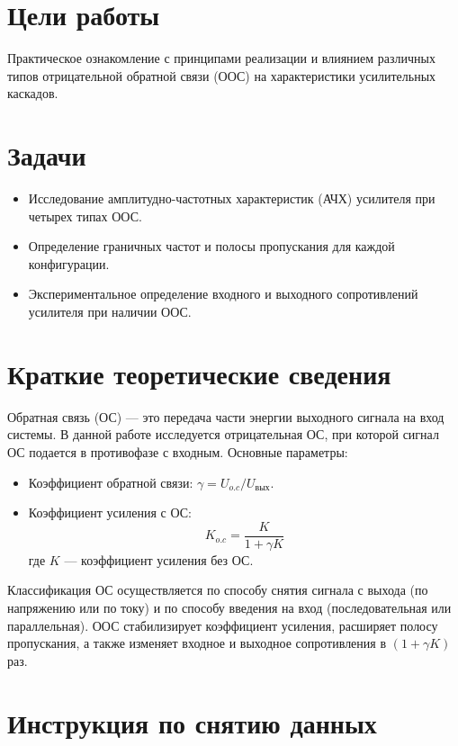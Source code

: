 \section*{Цели работы}
Практическое ознакомление с принципами реализации и влиянием различных типов отрицательной обратной связи (ООС) на характеристики усилительных каскадов.

\section*{Задачи}
\begin{itemize}
    \item Исследование амплитудно-частотных характеристик (АЧХ) усилителя при четырех типах ООС.
    \item Определение граничных частот и полосы пропускания для каждой конфигурации.
    \item Экспериментальное определение входного и выходного сопротивлений усилителя при наличии ООС.
\end{itemize}

\section*{Краткие теоретические сведения}
Обратная связь (ОС) — это передача части энергии выходного сигнала на вход системы. В данной работе исследуется отрицательная ОС, при которой сигнал ОС подается в противофазе с входным. Основные параметры:
\begin{itemize}
    \item Коэффициент обратной связи: $\gamma = U_{o.c} / U_{вых}$.
    \item Коэффициент усиления с ОС:
    \begin{equation*}
        K_{o.c} = \frac{K}{1 + \gamma K}
    \end{equation*}
    где $K$ — коэффициент усиления без ОС.
\end{itemize}
Классификация ОС осуществляется по способу снятия сигнала с выхода (по напряжению или по току) и по способу введения на вход (последовательная или параллельная). ООС стабилизирует коэффициент усиления, расширяет полосу пропускания, а также изменяет входное и выходное сопротивления в $(1 + \gamma K)$ раз.

\section*{Инструкция по снятию данных}

